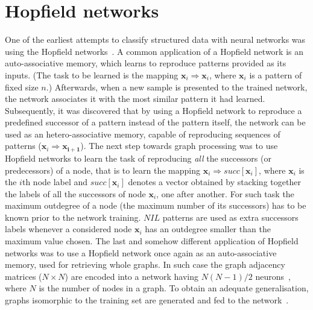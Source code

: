 \section{Hopfield networks}
One of the earliest attempts to classify structured data with neural networks was using the Hopfield networks~\cite{goulon2005hopfield}. A common application of a Hopfield network is an auto-associative memory, which learns to reproduce patterns provided as its inputs. (The task to be learned is the mapping $\bm{x}_i \Rightarrow \bm{x}_i$, where $\bm{x}_i$ is a pattern of fixed size $n$.) Afterwards, when a new sample is presented to the trained network, the network associates it with the most similar pattern it had learned. Subsequently, it was discovered that by using a Hopfield network to reproduce a predefined successor of a pattern instead of the pattern itself, the network can be used as an hetero-associative memory, capable of reproducing sequences of patterns ($\bm{x}_i \Rightarrow \bm{x_{i+1}}$). The next step towards graph processing was to use Hopfield networks to learn the task of reproducing \emph{all} the successors (or predecessors) of a node, that is to learn the mapping $\bm{x}_i \Rightarrow succ[\bm{x}_i]$, where $\bm{x}_i$ is the $i$th node label and $succ[\bm{x}_i]$ denotes a vector obtained by stacking together the labels of all the successors of node $\bm{x}_i$, one after another. For such task the maximum outdegree of a node (the maximum number of its successors) has to be known prior to the network training. $NIL$ patterns are used as extra successors labels whenever a considered node $\bm{x}_i$ has an outdegree smaller than the maximum value chosen. The last and somehow different application of Hopfield networks was to use a Hopfield network once again as an auto-associative memory, used for retrieving whole graphs. In such case the graph adjacency matrices ($N \times N$) are encoded into a network having $N(N - 1)/2$ neurons~\cite{goulon2005hopfield}, where $N$ is the number of nodes in a graph. To obtain an adequate generalisation, graphs isomorphic to the training set are generated and fed to the network~\cite{kree1988recognition}.

